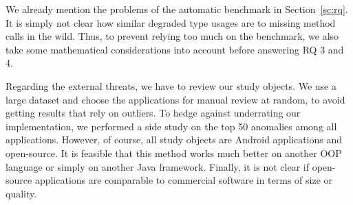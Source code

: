 We already mention the problems of the automatic benchmark in Section~\ref{sc:rq}.
It is simply not clear how similar degraded type usages are to missing method calls in the wild.
Thus, to prevent relying too much on the benchmark, we also take some mathematical considerations into account before answering RQ 3 and 4.

Regarding the external threats, we have to review our study objects.
We use a large dataset and choose the applications for manual review at random, to avoid getting results that rely on outliers.
To hedge against underrating our implementation, we performed a side study on the top 50 anomalies among all applications.
However, of course, all study objects are Android applications and open-source.
It is feasible that this method works much better on another OOP language or simply on another Java framework.
Finally, it is not clear if open-source applications are comparable to commercial software in terms of size or quality.

